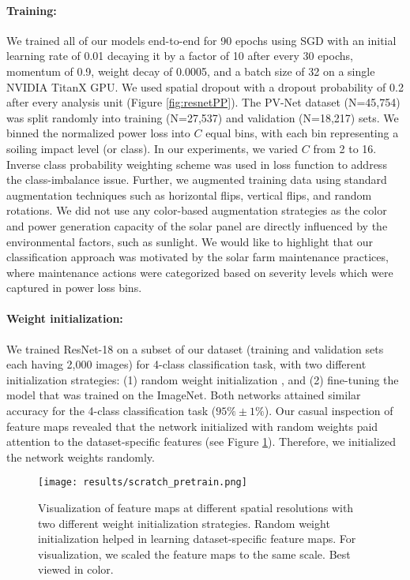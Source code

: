 \documentclass[10pt,twocolumn,letterpaper]{article}
\begin{document}
\vspace{-4mm}
\paragraph{Training:} We trained all of our models end-to-end for 90 epochs using SGD with an initial learning rate of 0.01 decaying it by a factor of 10 after every 30 epochs, momentum of 0.9, weight decay of 0.0005, and a batch size of 32 on a single NVIDIA TitanX GPU. We used spatial dropout \cite{tompson2015efficient} with a dropout probability of 0.2 after every analysis unit (Figure \ref{fig:resnetPP}). The PV-Net dataset (N=45,754) was split randomly into training (N=27,537) and validation (N=18,217) sets. We binned the normalized power loss into $C$ equal bins, with each bin representing a soiling impact level (or class). In our experiments, we varied $C$ from 2 to 16. Inverse class probability weighting scheme was used in loss function to address the class-imbalance issue. Further, we augmented training data using standard augmentation techniques such as horizontal flips, vertical flips, and random rotations. We did not use any color-based augmentation strategies as the color and power generation capacity of the solar panel are directly influenced by the environmental factors, such as sunlight. We would like to highlight that our classification approach was motivated by the solar farm maintenance practices, where maintenance actions were categorized based on severity levels which were captured in power loss bins.

\vspace{-4mm}
\paragraph{Weight initialization:} We trained ResNet-18 on a subset of our dataset (training and validation sets each having 2,000 images) for 4-class classification task, with two different initialization strategies: (1) random weight initialization \cite{he2015delving}, and (2) fine-tuning the model that was trained on the ImageNet. Both networks attained similar accuracy for the 4-class classification task ($95\% \pm 1\%$). Our casual inspection of feature maps revealed that the network initialized with random weights paid attention to the dataset-specific features (see Figure \ref{fig:featVisScrPre}). Therefore, we initialized the network weights randomly.

\begin{figure}[b!]
\centering
\texttt{[image: results/scratch\_pretrain.png]}
\setlength{\belowcaptionskip}{-4mm}
\caption{Visualization of feature maps at different spatial resolutions with two different weight initialization strategies. Random weight initialization helped in learning dataset-specific feature maps. For visualization, we scaled the feature maps to the same scale. Best viewed in color.}
\label{fig:featVisScrPre}
\end{figure}
\end{document}
